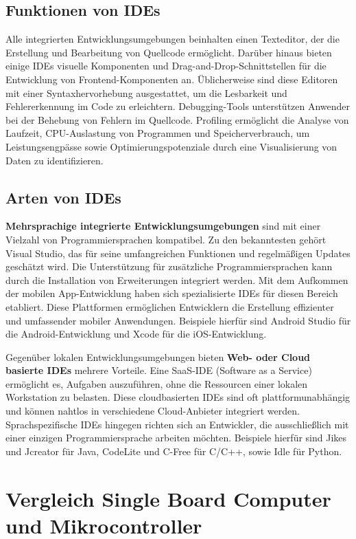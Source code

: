 \subsection{Funktionen von IDEs}
Alle integrierten Entwicklungsumgebungen beinhalten einen Texteditor, der die Erstellung und Bearbeitung von Quellcode ermöglicht. Darüber hinaus bieten einige IDEs visuelle Komponenten und Drag-and-Drop-Schnittstellen für die Entwicklung von Frontend-Komponenten an. Üblicherweise sind diese Editoren mit einer Syntaxhervorhebung ausgestattet, um die Lesbarkeit und Fehlererkennung im Code zu erleichtern. Debugging-Tools unterstützen Anwender bei der Behebung von Fehlern im Quellcode. Profiling ermöglicht die Analyse von Laufzeit, CPU-Auslastung von Programmen und Speicherverbrauch, um Leistungsengpässe sowie Optimierungspotenziale durch eine Visualisierung von Daten zu identifizieren. 

\subsection{Arten von IDEs}
\textbf{Mehrsprachige integrierte Entwicklungsumgebungen} sind mit einer Vielzahl von Programmiersprachen kompatibel. Zu den bekanntesten gehört Visual Studio, das für seine umfangreichen Funktionen und regelmäßigen Updates geschätzt wird. Die Unterstützung für zusätzliche Programmiersprachen kann durch die Installation von Erweiterungen integriert werden. Mit dem Aufkommen der mobilen App-Entwicklung haben sich spezialisierte IDEs für diesen Bereich etabliert. Diese Plattformen ermöglichen Entwicklern die Erstellung effizienter und umfassender mobiler Anwendungen. Beispiele hierfür sind Android Studio für die Android-Entwicklung und Xcode für die iOS-Entwicklung.

Gegenüber lokalen Entwicklungsumgebungen bieten \textbf{Web- oder Cloud basierte IDEs} mehrere Vorteile. Eine SaaS-IDE (Software as a Service) ermöglicht es, Aufgaben auszuführen, ohne die Ressourcen einer lokalen Workstation zu belasten. Diese cloudbasierten IDEs sind oft plattformunabhängig und können nahtlos in verschiedene Cloud-Anbieter integriert werden.
Sprachspezifische IDEs hingegen richten sich an Entwickler, die ausschließlich mit einer einzigen Programmiersprache arbeiten möchten. Beispiele hierfür sind Jikes und Jcreator für Java, CodeLite und C-Free für C/C++, sowie Idle für Python. \parencite{integrierteEntwicklungsumgebung}


\newpage
\section{Vergleich Single Board Computer und Mikrocontroller}
